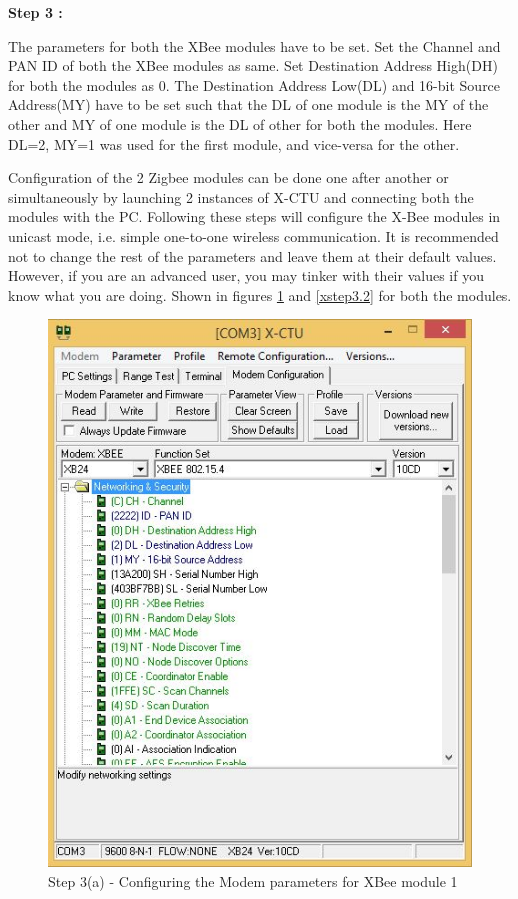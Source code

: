 \begin{flushleft}
\newpage

\textbf{Step 3 :}

\medskip

The parameters for both the XBee modules have to be set. Set the Channel and PAN ID of both the XBee modules as same. Set Destination Address High(DH) for both the modules as 0. The Destination Address Low(DL) and 16-bit Source Address(MY) have to be set such that the DL of one module is the MY of the other and MY of one module is the DL of other for both the modules. Here DL=2, MY=1 was used for the first module, and vice-versa for the other. 

\medskip
Configuration of the 2 Zigbee modules can be done one after another or simultaneously by launching 2 instances of X-CTU and connecting both the modules with the PC. Following these steps will configure the X-Bee modules in unicast mode, i.e. simple one-to-one wireless communication. It is recommended not to change the rest of the parameters and leave them at their default values. However, if you are an advanced user, you may tinker with their values if you know what you are doing.
Shown in figures \ref{xstep3.1} and \ref{xstep3.2} for both the modules.

\medskip

\begin{figure}[h]
\begin{center}
\includegraphics[scale=0.5]{zigbee_11}
\end{center}
\caption{Step 3(a) - Configuring the Modem parameters for XBee module 1}
\label{xstep3.1}
\end{figure}
\medskip


\end{flushleft}
